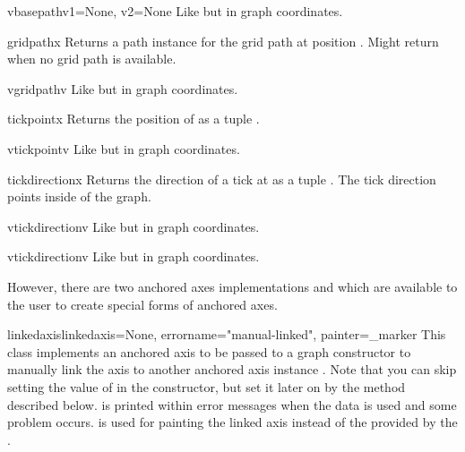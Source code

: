 \begin{methoddesc}[anchoredaxis]{vbasepath}{v1=None, v2=None}
  Like  but in graph coordinates.
\end{methoddesc}

\begin{methoddesc}[anchoredaxis]{gridpath}{x}
  Returns a path instance for the grid path at position .
  Might return  when no grid path is available.
\end{methoddesc}

\begin{methoddesc}[anchoredaxis]{vgridpath}{v}
  Like  but in graph coordinates.
\end{methoddesc}

\begin{methoddesc}[anchoredaxis]{tickpoint}{x}
  Returns the position of  as a tuple .
\end{methoddesc}

\begin{methoddesc}[anchoredaxis]{vtickpoint}{v}
  Like  but in graph coordinates.
\end{methoddesc}

\begin{methoddesc}[anchoredaxis]{tickdirection}{x}
  Returns the direction of a tick at  as a tuple .
  The tick direction points inside of the graph.
\end{methoddesc}

\begin{methoddesc}[anchoredaxis]{vtickdirection}{v}
  Like  but in graph coordinates.
\end{methoddesc}

\begin{methoddesc}[anchoredaxis]{vtickdirection}{v}
  Like  but in graph coordinates.
\end{methoddesc}

However, there are two anchored axes implementations
 and  which are available to
the user to create special forms of anchored axes.

\begin{classdesc}{linkedaxis}{linkedaxis=None, errorname="manual-linked", painter=_marker}
  This class implements an anchored axis to be passed to a graph
  constructor to manually link the axis to another anchored axis
  instance . Note that you can skip setting the value
  of  in the constructor, but set it later on by the
   method described below.  is
  printed within error messages when the data is used and some problem
  occurs.  is used for painting the linked axis instead
  of the  provided by the .
\end{classdesc}

